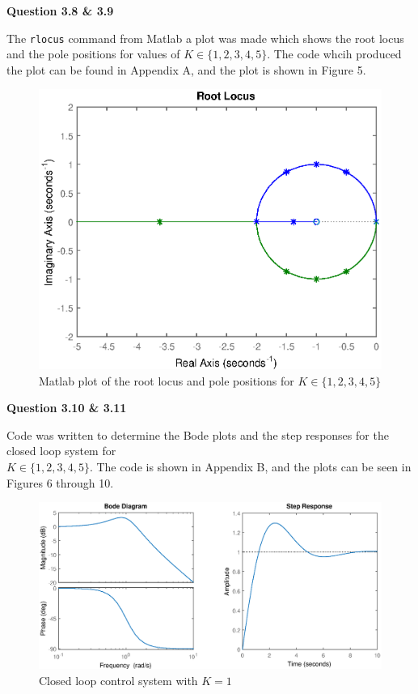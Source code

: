 \documentclass{article}
\begin{document}
	\textbf{Question 3.8 \& 3.9}
	
	The \verb|rlocus| command from Matlab a plot was made which shows the root locus and the pole positions for values of $K \in \{1,2,3,4,5\}$. The code whcih produced the plot can be found in Appendix A, and the plot is shown in Figure 5.
	
	\begin{figure}[h]
		\centering
		\includegraphics[scale=0.8]{fig1.eps}
		\caption{Matlab plot of the root locus and pole positions for $K \in \{1, 2, 3, 4, 5\}$}
	\end{figure}

	
	\textbf{Question 3.10 \& 3.11}
	
	Code was written to determine the Bode plots and the step responses for the closed loop system for\\ $K \in \{1,2,3,4,5\}$. The code is shown in Appendix B, and the plots can be seen in Figures 6 through 10.
	
	\begin{figure}[h]
		\centering
		\includegraphics[scale=0.5]{fig2.eps}
		\caption{Closed loop control system with $K = 1$}
	\end{figure}
	
\end{document}
